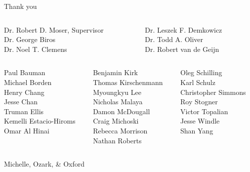 \documentclass[mathserif]{beamer}
\begin{document}
\begin{frame}{Thank you}
\begin{center}
\begin{columns}
   \begin{column}{0.44\linewidth}
      Dr\@. Robert D. Moser, Supervisor \\
      Dr\@. George Biros \\
      Dr\@. Noel T. Clemens
  \end{column}
  \begin{column}{0.44\linewidth}
      Dr\@. Leszek F. Demkowicz \\
      Dr\@. Todd A. Oliver \\
      Dr\@. Robert van de Geijn
  \end{column}
\end{columns}
\vspace{2em}
\pause{}
\begin{columns}[t]
    \begin{column}{0.32\linewidth}
        Paul Bauman \\
        Michael Borden \\
        Henry Chang \\
        Jesse Chan \\
        Truman Ellis \\
        Kemelli Estacio-Hiroms \\
        Omar Al Hinai
    \end{column}
    \begin{column}{0.32\linewidth}
        Benjamin Kirk \\
        Thomas Kirschenmann \\
        Myoungkyu Lee \\
        Nicholas Malaya \\
        Damon McDougall \\
        Craig Michoski \\
        Rebecca Morrison \\
        Nathan Roberts
    \end{column}
    \begin{column}{0.32\linewidth}
        Oleg Schilling \\
        Karl Schulz \\
        Christopher Simmons \\
        Roy Stogner \\
        Victor Topalian \\
        Jesse Windle \\
        Shan Yang
    \end{column}
\end{columns}
\vspace{2em}
\pause{}
Michelle, Ozark, \& Oxford
\end{center}
\end{frame}


\end{document}
